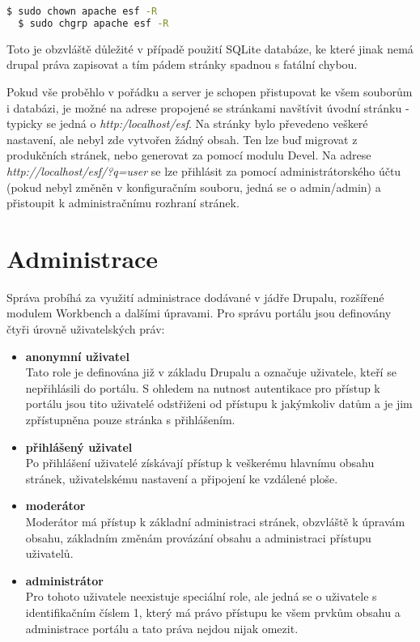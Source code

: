 \begin{lstlisting}[language=bash]
  $ sudo chown apache esf -R 
  $ sudo chgrp apache esf -R
\end{lstlisting}

Toto je obzvláště důležité v případě použití SQLite databáze, ke které jinak nemá drupal práva zapisovat a tím pádem stránky spadnou s fatální chybou. 

Pokud vše proběhlo v pořádku a server je schopen přistupovat ke všem souborům i databázi, je možné na adrese propojené se stránkami navštívit úvodní stránku - typicky se jedná o \emph{http:/localhost/esf}. Na stránky bylo převedeno veškeré nastavení, ale nebyl zde vytvořen žádný obsah. Ten lze buď migrovat z produkčních stránek, nebo generovat za pomocí modulu Devel. Na adrese \emph{http://localhost/esf/?q=user} se lze přihlásit za pomocí administrátorského účtu (pokud nebyl změněn v konfiguračním souboru, jedná se o admin/admin) a přistoupit k administračnímu rozhraní stránek.

\section{Administrace}
Správa probíhá za využití administrace dodávané v jádře Drupalu, rozšířené modulem Workbench a dalšími úpravami. Pro správu portálu jsou definovány čtyři úrovně uživatelských práv:

\begin{itemize}
  \item \textbf{anonymní uživatel} \hfill \\
    Tato role je definována již v základu Drupalu a označuje uživatele, kteří se nepřihlásili do portálu. S ohledem na nutnost autentikace pro přístup k portálu jsou tito uživatelé odstřiženi od přístupu k jakýmkoliv datům a je jim zpřístupněna pouze stránka s přihlášením.
  \item \textbf{přihlášený uživatel} \hfill \\
    Po přihlášení uživatelé získávají přístup k veškerému hlavnímu obsahu stránek, uživatelskému nastavení a připojení ke vzdálené ploše. 
  \item \textbf{moderátor} \hfill \\
    Moderátor má přístup k základní administraci stránek, obzvláště k úpravám obsahu, základním změnám provázání obsahu a administraci přístupu uživatelů.
  \item \textbf{administrátor} \hfill \\
    Pro tohoto uživatele neexistuje speciální role, ale jedná se o uživatele s identifikačním číslem 1, který má právo přístupu ke všem prvkům obsahu a administrace portálu a tato práva nejdou nijak omezit.
\end{itemize}

